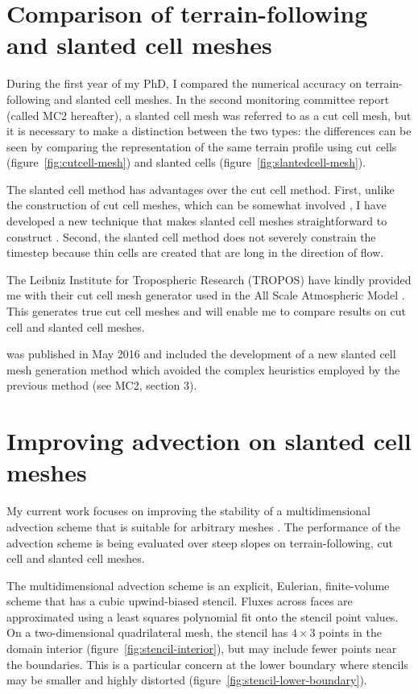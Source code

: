 \documentclass[a4paper,11pt]{article}
\begin{document}
\section{Comparison of terrain-following and slanted cell meshes}
\label{sec:tf-slanted-cells}

During the first year of my PhD, I compared the numerical accuracy on terrain-following and slanted cell meshes.
In the second monitoring committee report (called MC2 hereafter), a slanted cell mesh was referred to as a cut cell mesh, but it is necessary to make a distinction between the two types: the differences can be seen by comparing the representation of the same terrain profile using cut cells (figure~\ref{fig:cutcell-mesh}) and slanted cells (figure~\ref{fig:slantedcell-mesh}).

The slanted cell method has advantages over the cut cell method.  First, unlike the construction of cut cell meshes, which can be somewhat involved \citep{hartkopf2011}, I have developed a new technique that makes slanted cell meshes straightforward to construct \citep{shaw-weller2016}.  Second, the slanted cell method does not severely constrain the timestep because thin cells are created that are long in the direction of flow.

The Leibniz Institute for Tropospheric Research (TROPOS) have kindly provided me with their cut cell mesh generator used in the All Scale Atmospheric Model \citep{jaehn2015}.  This generates true cut cell meshes and will enable me to compare results on cut cell and slanted cell meshes.

\citet{shaw-weller2016} was published in May 2016 and included the development of a new slanted cell mesh generation method which avoided the complex heuristics employed by the previous method (see MC2, section 3).

\section{Improving advection on slanted cell meshes}
\label{sec:advection}

My current work focuses on improving the stability of a multidimensional advection scheme that is suitable for arbitrary meshes \citep{weller-shahrokhi2014}.  The performance of the advection scheme is being evaluated over steep slopes on terrain-following, cut cell and slanted cell meshes.

The multidimensional advection scheme is an explicit, Eulerian, finite-volume scheme that has a cubic upwind-biased stencil.  Fluxes across faces are approximated using a least squares polynomial fit onto the stencil point values.
On a two-dimensional quadrilateral mesh, the stencil has $4 \times 3$ points in the domain interior (figure~\ref{fig:stencil-interior}), but may include fewer points near the boundaries.  This is a particular concern at the lower boundary where stencils may be smaller and highly distorted (figure~\ref{fig:stencil-lower-boundary}).
\end{document}
